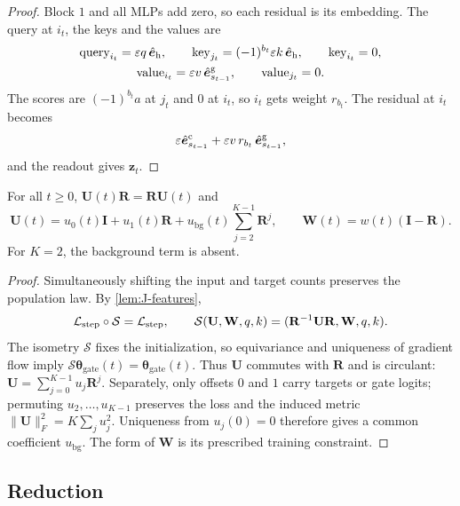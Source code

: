 \begin{proof}
Block $1$ and all MLPs add zero, so each residual is its embedding. The query at $i_t$, the keys and the values are
\begin{gather*}
 \text{query}_{i_t}=\varepsilon q\,\hat{\bm e}_{\mathrm h},\qquad \text{key}_{j_t}=(-1)^{b_t}\varepsilon k\,\hat{\bm e}_{\mathrm h},\qquad \text{key}_{i_t}=0,\\
 \text{value}_{i_t}=\varepsilon v\,\hat{\bm e}^{\mathrm g}_{s_{t-1}},\qquad \text{value}_{j_t}=0 .
\end{gather*}
The scores are $(-1)^{b_t}a$ at $j_t$ and $0$ at $i_t$, so $i_t$ gets weight $r_{b_t}$. The residual at $i_t$ becomes
\[
 \varepsilon\hat{\bm e}^{\mathrm c}_{s_{t-1}}+\varepsilon v\,r_{b_t}\,\hat{\bm e}^{\mathrm g}_{s_{t-1}},
\]
and the readout gives $\bm z_t$.
\end{proof}

\begin{lemma}
\label{lem:J-symmetry}
For all $t\ge0$, $\mathbf U(t)\mathbf R=\mathbf R\mathbf U(t)$ and
\[
 \mathbf U(t)=u_0(t)\mathbf I+u_1(t)\mathbf R
 +u_{\mathrm{bg}}(t)\sum_{j=2}^{K-1}\mathbf R^j,\qquad
 \mathbf W(t)=w(t)(\mathbf I-\mathbf R).
\]
For $K=2$, the background term is absent.
\end{lemma}

\begin{proof}
Simultaneously shifting the input and target counts preserves the population law. By \cref{lem:J-features},
\[
 \mathcal L_{\mathrm{step}}\circ\mathcal S=\mathcal L_{\mathrm{step}},\qquad
 \mathcal S(\mathbf U,\mathbf W,q,k)=(\mathbf R^{-1}\mathbf U\mathbf R,\mathbf W,q,k).
\]
The isometry $\mathcal S$ fixes the initialization, so equivariance and uniqueness of gradient flow imply $\mathcal S\bm\theta_{\mathrm{gate}}(t)=\bm\theta_{\mathrm{gate}}(t)$.
Thus $\mathbf U$ commutes with $\mathbf R$ and is circulant: $\mathbf U=\sum_{j=0}^{K-1}u_j\mathbf R^j$.
Separately, only offsets $0$ and $1$ carry targets or gate logits; permuting $u_2,\ldots,u_{K-1}$ preserves the loss and the
induced metric $\|\mathbf U\|_F^2=K\sum_j u_j^2$. Uniqueness from $u_j(0)=0$ therefore gives a common coefficient $u_{\mathrm{bg}}$.
The form of $\mathbf W$ is its prescribed training constraint.
\end{proof}

\subsection{Reduction}

